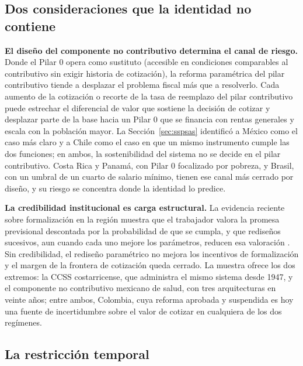 \documentclass[12pt, letterpaper]{article}
\begin{document}
\subsection{Dos consideraciones que la identidad no contiene}

\textbf{El diseño del componente no contributivo determina el canal de riesgo.}
Donde el Pilar 0 opera como sustituto (accesible en condiciones comparables al
contributivo sin exigir historia de cotización), la reforma paramétrica del pilar
contributivo tiende a desplazar el problema fiscal más que a resolverlo. Cada
aumento de la cotización o recorte de la tasa de reemplazo del pilar contributivo
puede estrechar el diferencial de valor que sostiene la decisión de cotizar y
desplazar parte de la base hacia un Pilar 0 que se financia con rentas generales y escala con la
población mayor. La Sección~\ref{sec:sspsas} identificó a México como el caso más
claro y a Chile como el caso en que un mismo instrumento cumple las dos funciones;
en ambos, la sostenibilidad del sistema no se decide en el pilar contributivo. Costa
Rica y Panamá, con Pilar 0 focalizado por pobreza, y Brasil, con un umbral de un
cuarto de salario mínimo, tienen ese canal más cerrado por diseño, y su riesgo se
concentra donde la identidad lo predice.

\textbf{La credibilidad institucional es carga estructural.} La evidencia reciente
sobre formalización en la región muestra que el trabajador valora la promesa
previsional descontada por la probabilidad de que se cumpla, y que rediseños
sucesivos, aun cuando cada uno mejore los parámetros, reducen esa valoración
\citep{wb2025}. Sin credibilidad, el rediseño paramétrico no mejora los incentivos
de formalización y el margen de la frontera de cotización queda cerrado. La
muestra ofrece los dos extremos: la CCSS costarricense, que administra el mismo
sistema desde 1947, y el componente no contributivo mexicano de salud, con tres
arquitecturas en veinte años; entre ambos, Colombia, cuya reforma aprobada y
suspendida es hoy una fuente de incertidumbre sobre el valor de cotizar en
cualquiera de los dos regímenes.

\subsection{La restricción temporal}
\end{document}
